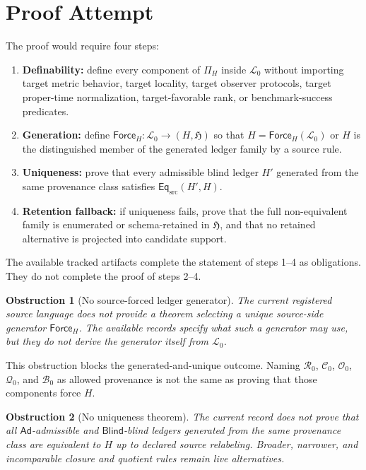 \documentclass[11pt]{article}
\newcommand{\Lang}{\mathcal{L}_{0}}
\newcommand{\LedgerFam}{\mathfrak{H}}
\newcommand{\Ad}{\mathsf{Ad}}
\newcommand{\Blind}{\mathsf{Blind}}
\newcommand{\ForceH}{\mathsf{Force}_{H}}
\newcommand{\EqSrc}{\mathsf{Eq}_{\mathrm{src}}}
\newtheorem{obstruction}{Obstruction}
\begin{document}
\section{Proof Attempt}

The proof would require four steps:

\begin{enumerate}
    \item \textbf{Definability:} define every component of \(\Pi_H\) inside
    \(\Lang\) without importing target metric behavior, target locality,
    target observer protocols, target proper-time normalization,
    target-favorable rank, or benchmark-success predicates.
    \item \textbf{Generation:} define \(\ForceH:\Lang\to(H,\LedgerFam)\)
    so that \(H=\ForceH(\Lang)\) or \(H\) is the distinguished member of the
    generated ledger family by a source rule.
    \item \textbf{Uniqueness:} prove that every admissible blind ledger
    \(H'\) generated from the same provenance class satisfies
    \(\EqSrc(H',H)\).
    \item \textbf{Retention fallback:} if uniqueness fails, prove that the
    full non-equivalent family is enumerated or schema-retained in
    \(\LedgerFam\), and that no retained alternative is projected into
    candidate support.
\end{enumerate}

The available tracked artifacts complete the statement of steps 1--4 as
obligations. They do not complete the proof of steps 2--4.

\begin{obstruction}[No source-forced ledger generator]
The current registered source language does not provide a theorem selecting
a unique source-side generator \(\ForceH\). The available records specify
what such a generator may use, but they do not derive the generator itself
from \(\Lang\).
\end{obstruction}

This obstruction blocks the generated-and-unique outcome. Naming
\(\mathcal{R}_{0}\), \(\mathcal{C}_{0}\), \(\mathcal{O}_{0}\),
\(\mathcal{Q}_{0}\), and \(\mathcal{B}_{0}\) as allowed provenance is not
the same as proving that those components force \(H\).

\begin{obstruction}[No uniqueness theorem]
The current record does not prove that all \(\Ad\)-admissible and
\(\Blind\)-blind ledgers generated from the same provenance class are
equivalent to \(H\) up to declared source relabeling. Broader, narrower, and
incomparable closure and quotient rules remain live alternatives.
\end{obstruction}
\end{document}
